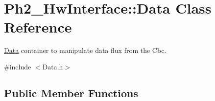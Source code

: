 \hypertarget{class_ph2___hw_interface_1_1_data}{\section{Ph2\-\_\-\-Hw\-Interface\-:\-:Data Class Reference}
\label{class_ph2___hw_interface_1_1_data}
}


\hyperlink{class_ph2___hw_interface_1_1_data}{Data} container to manipulate data flux from the Cbc.  




{\ttfamily \#include $<$Data.\-h$>$}

\subsection*{Public Member Functions}
